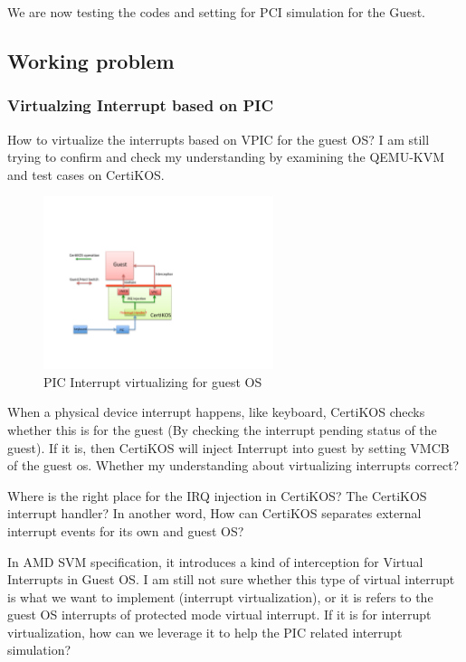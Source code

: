 \documentclass[a4paper,12pt]{article}
\begin{document}
We are now testing the codes and setting for PCI simulation for the Guest. 

\subsection{Working problem}

\subsubsection{Virtualzing Interrupt  based on PIC}

How to virtualize the interrupts based on VPIC  for the guest OS? I am still trying to confirm and  check my understanding by  examining the QEMU-KVM and test cases on CertiKOS. 
  \begin{figure}[!ht]
 \centerline{
 \includegraphics[width=0.6\textwidth]{interrupt_injection}}
 \caption{PIC Interrupt virtualizing for guest OS} \label{fig:interruptinjection}
\end{figure}

When a physical device interrupt happens, like keyboard,  CertiKOS checks whether this is for the guest (By checking the interrupt pending status of the guest). If it is, then CertiKOS will inject Interrupt into guest by setting VMCB of the guest os.   Whether my understanding about virtualizing interrupts correct? 

Where is the right place for the IRQ injection in CertiKOS? The CertiKOS interrupt handler?  In another word, How can CertiKOS separates external interrupt events for its own and guest OS? 

In AMD SVM specification, it introduces a kind of interception for Virtual Interrupts in Guest OS.   I am still not sure whether this type of virtual interrupt is what we want to implement (interrupt virtualization),  or  it is refers to the guest OS  interrupts of protected mode virtual interrupt. If it is for interrupt virtualization, how can we leverage it to help the PIC related interrupt simulation?  
\end{document}
